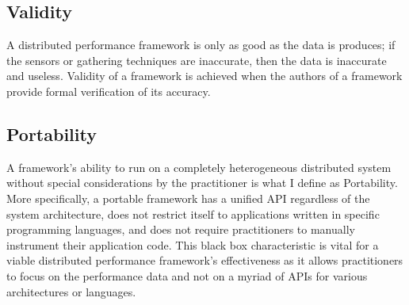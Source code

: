 \subsection{Validity}
A distributed performance framework is only as good as the data is produces; if the sensors or gathering techniques are inaccurate, then the data is inaccurate and useless. Validity of a framework is achieved when the authors of a framework provide formal verification of its accuracy.

\subsection{Portability}
A framework's ability to run on a completely heterogeneous distributed system without special considerations by the practitioner is what I define as Portability. More specifically, a portable framework has a unified API regardless of the system architecture, does not restrict itself to applications written in specific programming languages, and does not require practitioners to manually instrument their application code. This black box characteristic is vital for a viable distributed performance framework's effectiveness as it allows practitioners to focus on the performance data and not on a myriad of APIs for various architectures or languages.


